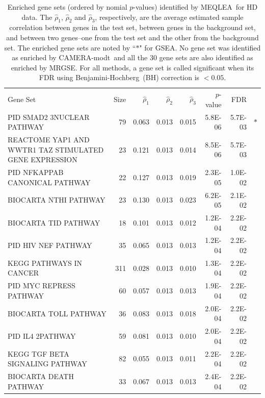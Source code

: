\documentclass[a4,center,fleqn]{NAR}
\newcommand{\OurMethod}{MEQLEA}
\newcommand{\CMT}{CAMERA-modt}
\newcommand{\genr}{MRGSE}
\newcommand{\FDR}{Benjamini-Hochberg}
\newcommand{\FDRabb}{BH}
\begin{document}
	
	\begin{table}[!ht]
		\centering 
		\caption{Enriched gene sets (ordered by nomial $p$-values) identified by \OurMethod~for HD data.
			The $\hat\rho_1$,  $\hat\rho_2$ and $\hat\rho_3$, respectively, are the average estimated sample
			correlation between genes in the test set, between genes in the background set, and between two
			genes--one from the test set and the other from the background set. The enriched gene sets are noted
			by ``$\ast$" for GSEA. No gene set was identified as enriched by \CMT~and all the 30 gene sets are
			also identified as enriched by \genr. For all methods, a gene set is called significant when its FDR
			using \FDR~(\FDRabb) correction is $<0.05$. }
		\begin{tabular}{p{3in}rrrrrrr}
		\toprule
			Gene Set & Size & $\hat\rho_1$ & $\hat\rho_2$ & $\hat\rho_3$ & $p$-value & FDR & \\ 
			\colrule
			PID SMAD2 3NUCLEAR PATHWAY & 79 & 0.063 & 0.013 & 0.015 & 5.8E-06 & 5.7E-03 & $\ast$ \\ 
			REACTOME YAP1 AND WWTR1 TAZ STIMULATED GENE EXPRESSION & 23 & 0.121 & 0.013 & 0.014 & 8.5E-06 & 5.7E-03 &  \\ 
			PID NFKAPPAB CANONICAL PATHWAY & 22 & 0.127 & 0.013 & 0.019 & 2.3E-05 & 1.0E-02 &  \\ 
			BIOCARTA NTHI PATHWAY & 23 & 0.130 & 0.013 & 0.023 & 6.2E-05 & 2.1E-02 &  \\ 
			BIOCARTA TID PATHWAY & 18 & 0.101 & 0.013 & 0.012 & 1.2E-04 & 2.2E-02 &  \\ 
			PID HIV NEF PATHWAY & 35 & 0.065 & 0.013 & 0.013 & 1.2E-04 & 2.2E-02 &  \\ 
			KEGG PATHWAYS IN CANCER & 311 & 0.028 & 0.013 & 0.010 & 1.3E-04 & 2.2E-02 &  \\ 
			PID MYC REPRESS PATHWAY & 60 & 0.057 & 0.013 & 0.013 & 1.9E-04 & 2.2E-02 &  \\ 
			BIOCARTA TOLL PATHWAY & 36 & 0.083 & 0.013 & 0.018 & 2.0E-04 & 2.2E-02 &  \\ 
			PID IL4 2PATHWAY & 59 & 0.081 & 0.013 & 0.010 & 2.0E-04 & 2.2E-02 &  \\ 
			KEGG TGF BETA SIGNALING PATHWAY & 82 & 0.055 & 0.013 & 0.011 & 2.2E-04 & 2.2E-02 &  \\ 
			BIOCARTA DEATH PATHWAY & 33 & 0.067 & 0.013 & 0.013 & 2.4E-04 & 2.2E-02 &  \\ 

\end{tabular}
\end{table}
\end{document}
